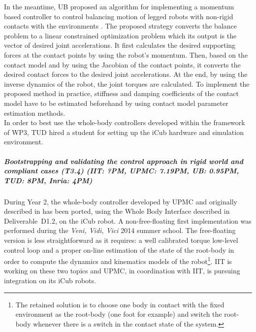 In the meantime, UB proposed an algorithm for implementing a momentum
based controller to control balancing motion of legged robots with non-rigid
contacts with the environments \cite{Azad&Mistry15}.  The proposed strategy
converts the balance problem to a linear constrained optimization problem
which its output is the vector of desired joint accelerations.  It first
calculates the desired supporting forces at the contact points by using the
robot’s momentum.  Then, based on the contact model and by using the Jacobian
of the contact points, it converts the desired contact forces to the desired
joint accelerations.  At the end, by using the inverse dynamics of the robot,
the joint torques are calculated.  To implement the proposed method in
practice, stiffness and damping coefficients of the contact model have to be
estimated beforehand by using contact model parameter estimation methods.\\
    
In order to best use the whole-body controllers developed within the framework of WP3, TUD hired a student for setting up the iCub hardware and simulation environment.


\subparagraph{Bootstrapping and validating the control approach in rigid world and compliant cases (T3.4) (IIT: ?PM, UPMC: 7.19PM, UB: 0.95PM, TUD: 8PM, Inria: 4PM)}

During Year 2, the whole-body controller developed by UPMC and originally described in \cite{salini2012} has been ported, using the Whole Body Interface described in Deliverable~D1.2, on the iCub robot. A non-free-floating first implementation was performed during the \textit{Veni, Vidi, Vici} 2014 summer school. The free-floating version is less straightforward as it requires: a well calibrated torque low-level control loop and a proper on-line estimation of the state of the root-body in order to  compute the dynamics and kinematics models of the robot\footnote{The retained solution is to choose one body in contact with the fixed environment as the root-body (one foot for example) and switch the root-body whenever there is a switch in the contact state of the system.}. IIT is working on these two topics and UPMC, in coordination with IIT, is pursuing integration on its iCub robots.

